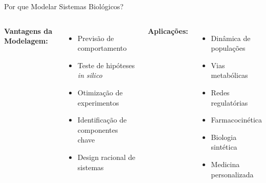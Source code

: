 \begin{frame}{Por que Modelar Sistemas Biológicos?}
\begin{columns}
\textbf{Vantagens da Modelagem:}
\begin{itemize}
    \item Previsão de comportamento
    \item Teste de hipóteses \textit{in silico}
    \item Otimização de experimentos
    \item Identificação de componentes chave
    \item Design racional de sistemas
\end{itemize}

\textbf{Aplicações:}
\begin{itemize}
    \item Dinâmica de populações
    \item Vias metabólicas
    \item Redes regulatórias
    \item Farmacocinética
    \item Biologia sintética
    \item Medicina personalizada
\end{itemize}
\end{columns}

\vspace{0.3cm}

\end{frame}

